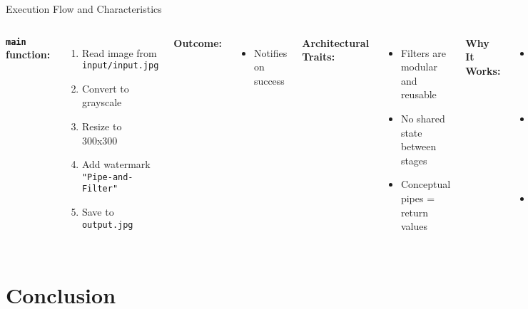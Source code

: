\documentclass[aspectratio=169, table]{beamer}
\begin{document}
\begin{frame}[fragile]{Execution Flow and Characteristics}
	\vspace{20pt}
	\begin{columns}[T]
		\textbf{\texttt{main} function:}
		\begin{enumerate}
			\item Read image from \texttt{input/input.jpg}
			\item Convert to grayscale
			\item Resize to 300x300
			\item Add watermark \texttt{"Pipe-and-Filter"}
			\item Save to \texttt{output.jpg}
		\end{enumerate}
		
		\textbf{Outcome:}
		\begin{itemize}
			\item Notifies on success
		\end{itemize}
		
		\textbf{Architectural Traits:}
		\begin{itemize}
			\item Filters are modular and reusable
			\item No shared state between stages
			\item Conceptual pipes = return values
		\end{itemize}
		
		\textbf{Why It Works:}
		\begin{itemize}
			\item Suitable for step-by-step tasks
			\item Easily adapted to text or streaming pipelines
			\item Simple, clear, and scalable
		\end{itemize}
	\end{columns}
\end{frame}


\section{Conclusion}
\end{document}
